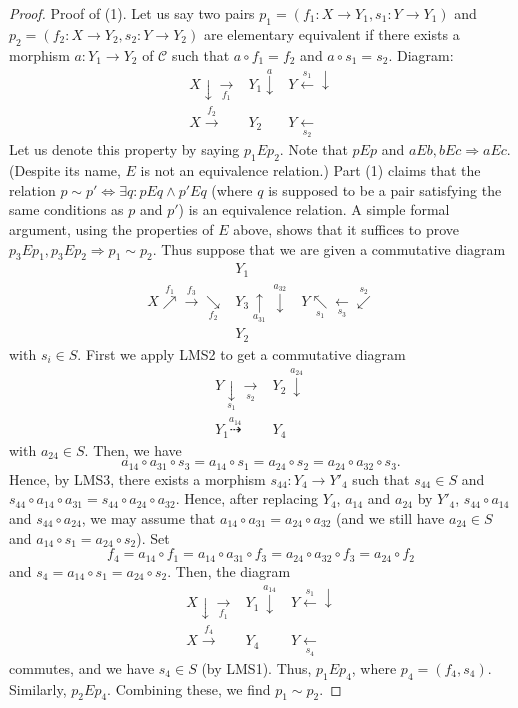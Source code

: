\begin{proof}
Proof of (1). Let us say two pairs $p_1 = (f_1 : X \to Y_1, s_1 : Y \to Y_1)$
and $p_2 = (f_2 : X \to Y_2, s_2 : Y \to Y_2)$ are elementary equivalent
if there exists a morphism $a : Y_1 \to Y_2$ of $\mathcal{C}$ such that
$a \circ f_1 = f_2$ and $a \circ s_1 = s_2$. Diagram:
$$
\begin{array}{ccc}X \downarrow\underset{f_1}{\longrightarrow} & Y_1 \overset{a}{\downarrow} & Y \overset{s_1}{\longleftarrow}\downarrow \\ X \overset{f_2}{\longrightarrow} & Y_2 & Y \underset{s_2}{\longleftarrow}\end{array}
$$
Let us denote this property by saying $p_1Ep_2$.
Note that $pEp$ and $aEb, bEc \Rightarrow aEc$.
(Despite its name, $E$ is not an equivalence
relation.)
Part (1) claims that the relation
$p \sim p' \Leftrightarrow \exists q: pEq \wedge p'Eq$
(where $q$ is supposed to be a pair satisfying the
same conditions as $p$ and $p'$)
is an equivalence relation. A simple formal argument, using the properties
of $E$ above, shows that it suffices to prove
$p_3Ep_1, p_3Ep_2 \Rightarrow p_1 \sim p_2$.
Thus suppose that we are given a commutative diagram
$$
\begin{array}{ccc} & Y_1 &  \\ X \overset{f_1}{\nearrow}\overset{f_3}{\longrightarrow}\underset{f_2}{\searrow} & Y_3 \underset{a_{31}}{\uparrow}\overset{a_{32}}{\downarrow} & Y \underset{s_1}{\nwarrow}\underset{s_3}{\longleftarrow}\overset{s_2}{\swarrow} \\  & Y_2 & \end{array}
$$
with $s_i \in S$.
First we apply LMS2 to get a commutative diagram
$$
\begin{array}{cc}Y \underset{s_1}{\downarrow}\underset{s_2}{\longrightarrow} & Y_2 \overset{a_{24}}{\downarrow} \\ Y_1 \overset{a_{14}}{\dashrightarrow} & Y_4\end{array}
$$
with $a_{24} \in S$. Then, we have
$$
a_{14} \circ a_{31} \circ s_3 =
a_{14} \circ s_1 =
a_{24} \circ s_2 =
a_{24} \circ a_{32} \circ s_3.
$$
Hence, by LMS3, there exists a
morphism $s_{44} : Y_4 \to Y'_4$ such that $s_{44} \in S$ and
$s_{44} \circ a_{14} \circ a_{31}
= s_{44} \circ a_{24} \circ a_{32}$.
Hence, after replacing $Y_4$, $a_{14}$ and $a_{24}$ by $Y'_4$,
$s_{44} \circ a_{14}$ and $s_{44} \circ a_{24}$, we may assume
that $a_{14} \circ a_{31} = a_{24} \circ a_{32}$ (and
we still have $a_{24} \in S$ and
$a_{14} \circ s_1 = a_{24} \circ s_2$). Set
$$
f_4 =
a_{14} \circ f_1 =
a_{14} \circ a_{31} \circ f_3 =
a_{24} \circ a_{32} \circ f_3 =
a_{24} \circ f_2
$$
and
$s_4 = a_{14} \circ s_1 = a_{24} \circ s_2$. Then, the diagram
$$
\begin{array}{ccc}X \downarrow\underset{f_1}{\longrightarrow} & Y_1 \overset{a_{14}}{\downarrow} & Y \overset{s_1}{\longleftarrow}\downarrow \\ X \overset{f_4}{\longrightarrow} & Y_4 & Y \underset{s_4}{\longleftarrow}\end{array}
$$
commutes, and we have $s_4 \in S$ (by LMS1). Thus, $p_1 E p_4$,
where $p_4 = (f_4, s_4)$. Similarly, $p_2 E p_4$. Combining these,
we find $p_1 \sim p_2$.


\end{proof}
